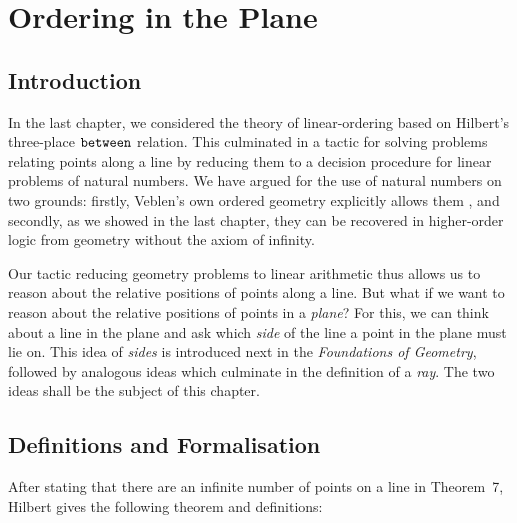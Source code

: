 \chapter{Ordering in the Plane}\label{chapter:HalfPlanes}

\section{Introduction}
In the last chapter, we considered the theory of linear-ordering based on Hilbert's three-place $\texttt{between}$ relation. This culminated in a tactic for solving problems relating points along a line by reducing them to a decision procedure for linear problems of natural numbers. We have argued for the use of natural numbers on two grounds: firstly, Veblen's own ordered geometry explicitly allows them \cite{Veblenphd}, and secondly, as we showed in the last chapter, they can be recovered in higher-order logic from geometry without the axiom of infinity.

Our tactic reducing geometry problems to linear arithmetic thus allows us to reason about the relative positions of points along a line. But what if we want to reason about the relative positions of points in a \emph{plane}? For this, we can think about a line in the plane and ask which \emph{side} of the line a point in the plane must lie on. This idea of \emph{sides} is introduced next in the \emph{Foundations of Geometry}, followed by analogous ideas which culminate in the definition of a \emph{ray}. The two ideas shall be the subject of this chapter. 

\section{Definitions and Formalisation}
After stating that there are an infinite number of points on a line in Theorem~7, Hilbert gives the following theorem and definitions:

